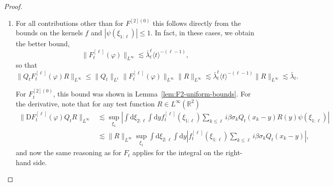 \documentclass[11pt, a4paper]{scrartcl}
\numberwithin{equation}{section}
\theoremstyle{plain}
\theoremstyle{remark}
\newcommand{\mathD}{\mathrm{D}}
\newcommand{\mathd}{\mathrm{d}}
\newenvironment{enumeratealpha}{\begin{enumerate}[a{\textup{)}}] }{\end{enumerate}}
\begin{document}
\begin{proof}
  
  \begin{enumeratealpha}
    \item For all contributions other than for $F^{[2] (0)}$ this follows
    directly from the bounds on the kernels $f$ and $| \psi (\xi_{1 : \ell}) |
    \leqslant 1$. In fact, in these cases, we obtain the better bound,
    \[ \| F_t^{[\ell]} (\varphi) \|_{L^{\infty}} \lesssim \bar{\lambda}_t^{\ell}
       \langle t \rangle^{- (\ell - 1)}, \]
    so that
    \[ \| Q_t F_t^{[\ell]} (\varphi) R \|_{L^{\infty}} \leqslant \| Q_t
       \|_{L^1} \| F^{[\ell]}_t (\varphi) \|_{L^{\infty}} \| R \|_{L^{\infty}}
       \lesssim \bar{\lambda}_t^{\ell} \langle t \rangle^{- (\ell - 1)} \| R
       \|_{L^{\infty}} \lesssim \bar{\lambda}_t . \]
    
    
    For $F^{[2] (0)}_t$, this bound was shown in
    Lemma~\ref{lem:F2-uniform-bounds}. For the derivative, note that for any
    test function $R \in L^{\infty} (\mathbb{R}^2)$
    \[ \begin{aligned}
         \| \mathD F^{[\ell]}_t (\varphi) Q_t R \|_{L^{\infty}} &\lesssim 
         \sup_{\xi_1} \left| \int \mathd \xi_{2 : \ell} \int \mathd
         yf^{[\ell]}_t (\xi_{1 : \ell}) \sum_{k \leqslant \ell} i \beta
         \sigma_k Q_t (x_k - y) R (y) \psi (\xi_{1 : \ell}) \right|\\
         & \lesssim  \| R \|_{L^{\infty}} \sup_{\xi_1} \int \mathd \xi_{2 :
         \ell} \int \mathd y \left| f^{[\ell]}_t (\xi_{1 : \ell}) \sum_{k
         \leqslant \ell} i \beta \sigma_k Q_t (x_k - y) \right|,
       \end{aligned} \]
    and now the same reasoning as for $F_t$ applies for the integral on the
    right-hand side.
    

\end{enumeratealpha}
\end{proof}
\end{document}

